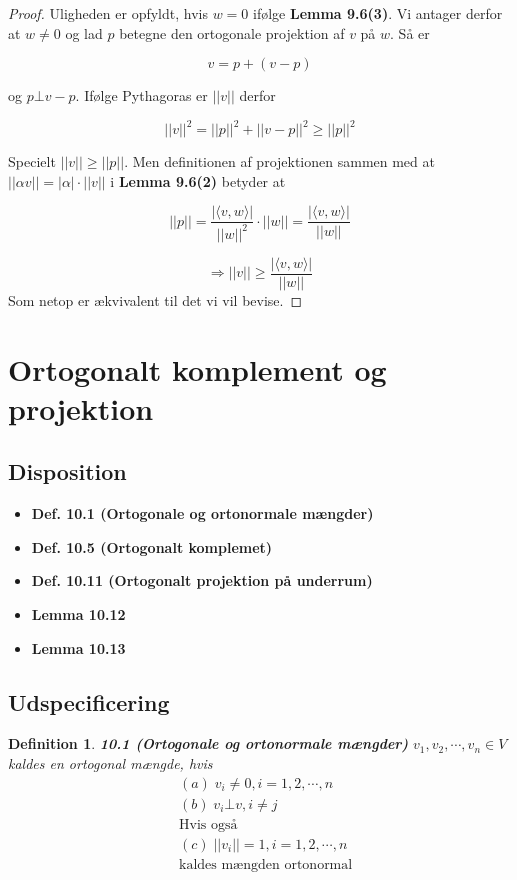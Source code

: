 \documentclass[paper=a4, fontsize=11pt]{scrartcl} %
\newtheorem*{definition}{Definition}
\newenvironment{cstmdefinition}[1]{\begin{definition} {\normalfont\textbf{#1}}}{\end{definition}}
\begin{document}
	\begin{proof}
		
		Uligheden er opfyldt, hvis $w = 0$ ifølge \textbf{Lemma 9.6(3)}. Vi antager derfor at $w \not = 0$ og lad $p$ betegne den ortogonale projektion af $v$ på $w$. Så er
		
		\[v = p + (v-p)\]
		
		og $p \bot v-p$. Ifølge Pythagoras er $||v||$ derfor
		
		\[||v||^2 = ||p||^2 + ||v - p||^2 \geq ||p||^2\]
		
		
		Specielt $||v|| \geq ||p||$. Men definitionen af projektionen sammen med at $||\alpha v|| = |\alpha| \cdot ||v||$ i \textbf{Lemma 9.6(2)} betyder at 
		
		\[||p|| = \frac{|\langle v,w \rangle |}{||w||^2} \cdot ||w|| = \frac{|\langle v,w \rangle|}{||w||}\]
		
		
		\[\Rightarrow ||v|| \geq \frac{ |\langle v,w \rangle | }{ ||w|| }\]
		Som netop er ækvivalent til det vi vil bevise.
		
		
	\end{proof}
	
	
	
	\newpage
	
	\section{Ortogonalt komplement og projektion}
	
	\subsection{Disposition}
	
	\begin{itemize}
		\item \textbf{Def. 10.1 (Ortogonale og ortonormale mængder)}
		\item \textbf{Def. 10.5 (Ortogonalt komplemet)}
		\item \textbf{Def. 10.11 (Ortogonalt projektion på underrum)}
		\item \textbf{Lemma 10.12}
		\item \textbf{Lemma 10.13}
	\end{itemize}
	
	\subsection{Udspecificering}
	
	\begin{cstmdefinition}{10.1 (Ortogonale og ortonormale mængder)}
		$v_1,v_2,\cdots,v_n \in V$ kaldes en ortogonal mængde, hvis
		\begin{align*}
			&(a) \; v_i \not = 0, i = 1,2,\cdots,n\\
			&(b) \; v_i \bot v, i \not = j\\
			&\text{Hvis også}\\
			&(c) \; ||v_i|| = 1, i = 1,2,\cdots,n\\
			&\text{kaldes mængden ortonormal}
		\end{align*}
		
	\end{cstmdefinition}
	
\end{document}
